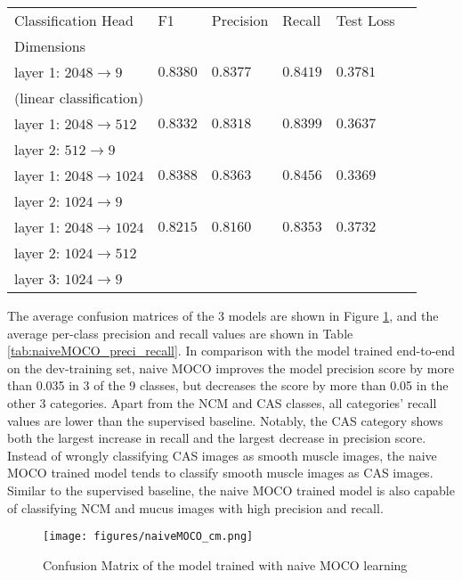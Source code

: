 \documentclass[12pt,twoside]{report}
\begin{document}
\begin{table}[]
    \centering
    \begin{tabular}{llllll}
    \toprule
    Classification Head & F1 & Precision & Recall & Test Loss \\
    Dimensions & & & & \\
    \midrule
    layer 1: $2048 \to 9$ & $0.8380$ & $0.8377$ & $0.8419$ & $0.3781$\\
    (linear classification)\\
    \midrule
    layer 1: $2048 \to 512$ & $0.8332$ & $0.8318$ & $0.8399$ & $0.3637$ \\
    layer 2: $512 \to 9$ \\
    \midrule
    layer 1: $2048 \to 1024$ & $0.8388$ & $0.8363$ & $0.8456$ & $0.3369$\\
    layer 2: $1024 \to 9$ \\
    \midrule
    layer 1: $2048 \to 1024$ & $0.8215$ & $0.8160$ & $0.8353$ & $0.3732$\\
    layer 2: $1024 \to 512$ \\
    layer 3: $1024 \to 9$ \\
    \bottomrule
    \end{tabular}
    \captionsetup{type=table}
    \label{tab:MOCO_multimlp}
\end{table}


The average confusion matrices of the 3 models are shown in Figure \ref{fig:naiveMOCO_cm}, and the average per-class precision and recall values are shown in Table \ref{tab:naiveMOCO_preci_recall}. In comparison with the model trained end-to-end on the dev-training set, naive MOCO improves the model precision score by more than 0.035 in 3 of the 9 classes, but decreases the score by more than 0.05 in the other 3 categories. Apart from the NCM and CAS classes, all categories' recall values are lower than the supervised baseline. Notably, the CAS category shows both the largest increase in recall and the largest decrease in precision score. Instead of wrongly classifying CAS images as smooth muscle images, the naive MOCO trained model tends to classify smooth muscle images as CAS images. Similar to the supervised baseline, the naive MOCO trained model is also capable of classifying NCM and mucus images with high precision and recall. \\ 

\begin{figure}
    \centering
    \texttt{[image: figures/naiveMOCO\_cm.png]}
    \caption{Confusion Matrix of the model trained with naive MOCO learning}
    \label{fig:naiveMOCO_cm}
\end{figure}
\end{document}
